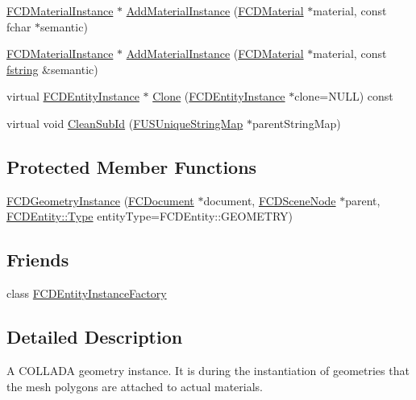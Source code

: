 \begin{DoxyCompactItemize}
\item 
\hyperlink{classFCDMaterialInstance}{FCDMaterialInstance} $\ast$ \hyperlink{classFCDGeometryInstance_aba21dfcfe5e44b555f3bf008bdda9559}{AddMaterialInstance} (\hyperlink{classFCDMaterial}{FCDMaterial} $\ast$material, const fchar $\ast$semantic)
\item 
\hyperlink{classFCDMaterialInstance}{FCDMaterialInstance} $\ast$ \hyperlink{classFCDGeometryInstance_ab4c4be172128f47986875e6253fa4bfe}{AddMaterialInstance} (\hyperlink{classFCDMaterial}{FCDMaterial} $\ast$material, const \hyperlink{classfm_1_1stringT}{fstring} \&semantic)
\item 
virtual \hyperlink{classFCDEntityInstance}{FCDEntityInstance} $\ast$ \hyperlink{classFCDGeometryInstance_ab056bfdefa8eb7c99a2551f114ae5242}{Clone} (\hyperlink{classFCDEntityInstance}{FCDEntityInstance} $\ast$clone=NULL) const 
\item 
virtual void \hyperlink{classFCDGeometryInstance_ab62a4a52c738bc6ef49e4744d4d12722}{CleanSubId} (\hyperlink{classFUUniqueStringMapT}{FUSUniqueStringMap} $\ast$parentStringMap)
\end{DoxyCompactItemize}
\subsection*{Protected Member Functions}
\begin{DoxyCompactItemize}
\item 
\hyperlink{classFCDGeometryInstance_a4f35018ca38e624d4aab01272ed77b08}{FCDGeometryInstance} (\hyperlink{classFCDocument}{FCDocument} $\ast$document, \hyperlink{classFCDSceneNode}{FCDSceneNode} $\ast$parent, \hyperlink{classFCDEntity_a9301a4bd5f4d4190ec13e40db4effdd7}{FCDEntity::Type} entityType=FCDEntity::GEOMETRY)
\end{DoxyCompactItemize}
\subsection*{Friends}
\begin{DoxyCompactItemize}
\item 
\hypertarget{classFCDGeometryInstance_a069ebb98497ccbc5fdcb75ecfa8b15f7}{
class \hyperlink{classFCDGeometryInstance_a069ebb98497ccbc5fdcb75ecfa8b15f7}{FCDEntityInstanceFactory}}
\label{classFCDGeometryInstance_a069ebb98497ccbc5fdcb75ecfa8b15f7}

\end{DoxyCompactItemize}


\subsection{Detailed Description}
A COLLADA geometry instance. It is during the instantiation of geometries that the mesh polygons are attached to actual materials. 

